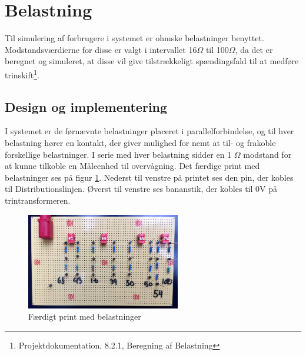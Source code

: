 
\section{Belastning}

Til simulering af forbrugere i systemet er ohmske belastninger benyttet. Modstandsværdierne for disse er valgt i intervallet 16$\Omega$ til 100$\Omega$, da det er beregnet og simuleret, at disse vil give tilstrækkeligt spændingsfald til at medføre trinskift\footnote{Projektdokumentation, 8.2.1, Beregning af Belastning}. 

\subsection{Design og implementering}

I systemet er de førnævnte belastninger placeret i parallelforbindelse, og til hver belastning hører en kontakt, der giver mulighed for nemt at til- og frakoble forskellige belastninger. I serie med hver belastning sidder en 1 $\Omega$ modstand for at kunne tilkoble en Måleenhed til overvågning. Det færdige print med belastninger ses på figur \ref{fig:Belastning}. Nederst til venstre på printet ses den pin, der kobles til Distributionslinjen. Øverst til venstre ses bananstik, der kobles til 0V på trintransformeren. 

\begin{figure}[H]
	\centering
	\includegraphics[width=0.6\textwidth]{figure/Belastningskreds}
	\caption{Færdigt print med belastninger}
	\label{fig:Belastning}
\end{figure}
